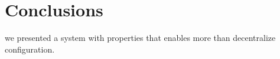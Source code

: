 \documentclass{sig-alternate}
\begin{document}
\section{Conclusions}

we presented a system with properties that enables more than decentralize configuration.%

%

%
%
\end{document}
